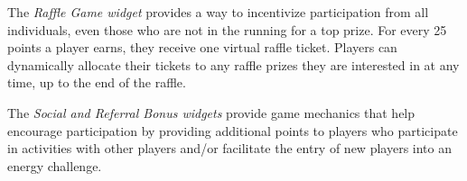 The {\em Raffle Game widget} provides a way to incentivize participation from all individuals, even those who are not in the running for a top prize. For every 25 points a player earns, they receive one virtual raffle ticket. Players can dynamically allocate their tickets to any raffle prizes they are interested in at any time, up to the end of the raffle.

The {\em Social and Referral Bonus widgets} provide game mechanics that help encourage participation by providing additional points to players who participate in activities with other players and/or facilitate the entry of new players into an energy challenge.

